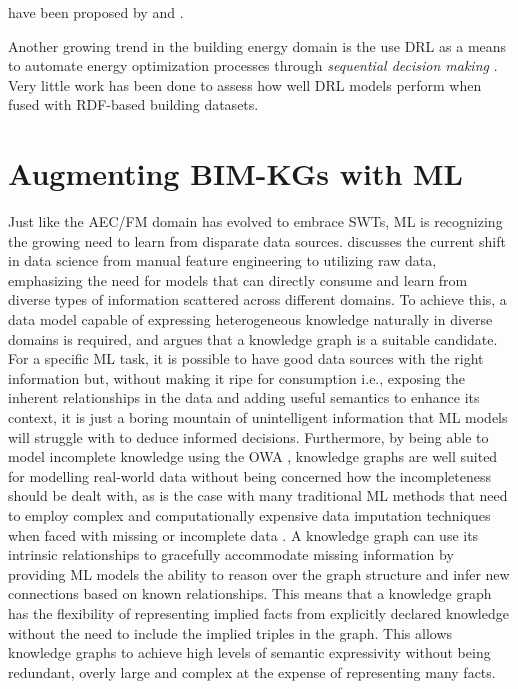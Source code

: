 have been proposed by \cite{Ricquebourg2007} and \cite{Tomic2010}.

Another growing trend in the building energy domain is the use \ac{DRL} as a means to automate energy optimization processes through \emph{sequential decision making} \citep{LeCun2015,Sutton1988}. Very little work has been done to assess how well \ac{DRL} models perform when fused with \ac{RDF}-based building datasets.


\section{Augmenting \acp{BIM-KG} with \acf{ML}}
\label{Knowledge graphs with DRL}

Just like the \ac{AEC/FM} domain has evolved to embrace \acp{SWT}, \ac{ML} is recognizing the growing need to learn from disparate data sources. \cite{Wilcke2017} discusses the current shift in data science from manual feature engineering to utilizing raw data, emphasizing the need for models that can directly consume and learn from diverse types of information scattered across different domains. To achieve this, a data model capable of expressing heterogeneous knowledge naturally in diverse domains is required, and \cite{Wilcke2017} argues that a knowledge graph is a suitable candidate. For a specific \ac{ML} task, it is possible to have good data sources with the right information but, without making it ripe for consumption i.e., exposing the inherent relationships in the data and adding useful semantics to enhance its context, it is just a boring mountain of unintelligent information that \ac{ML} models will struggle with to deduce informed decisions. Furthermore, by being able to model incomplete knowledge using the \ac{OWA} \citep{Berners-Lee2001,Berners-Lee2001a}, knowledge graphs are well suited for modelling real-world data without being concerned how the incompleteness should be dealt with, as is the case with many traditional \ac{ML} methods that need to employ complex and computationally expensive data imputation techniques when faced with missing or incomplete data \citep{Cunningham2007, Sterne2009, Priya2015}. A knowledge graph can use its intrinsic relationships to gracefully accommodate missing information by providing \ac{ML} models the ability to reason over the graph structure and infer new connections based on known relationships. This means that a knowledge graph has the flexibility of representing implied facts from explicitly declared knowledge without the need to include the implied triples in the graph. This allows knowledge graphs to achieve high levels of semantic expressivity without being redundant, overly large and complex at the expense of representing many facts.

